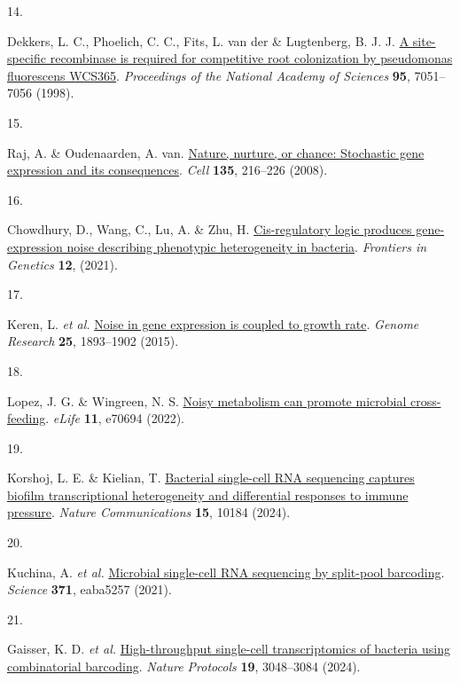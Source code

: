 \documentclass[
  11pt,
  a4paper,
]{report}
\newlength{\cslhangindent}
\newlength{\csllabelwidth}
\newenvironment{CSLReferences}[2] %
 {\begin{list}{}{%
  \setlength{\itemindent}{0pt}
  \setlength{\leftmargin}{0pt}
  \setlength{\parsep}{0pt}
  \ifodd #1
   \setlength{\leftmargin}{\cslhangindent}
   \setlength{\itemindent}{-1\cslhangindent}
  \fi
  \setlength{\itemsep}{#2\baselineskip}}}
 {\end{list}}
\newcommand{\CSLLeftMargin}[1]{\parbox[t]{\csllabelwidth}{\strut#1\strut}}
\newcommand{\CSLRightInline}[1]{\parbox[t]{\linewidth - \csllabelwidth}{\strut#1\strut}}
\begin{document}
\begin{CSLReferences}{0}{0}
\CSLLeftMargin{14. }%
\CSLRightInline{Dekkers, L. C., Phoelich, C. C., Fits, L. van der \&
Lugtenberg, B. J. J. \href{https://doi.org/10.1073/pnas.95.12.7051}{A
site-specific recombinase is required for competitive root colonization
by pseudomonas fluorescens WCS365}. \emph{Proceedings of the National
Academy of Sciences} \textbf{95}, 7051--7056 (1998).}

\CSLLeftMargin{15. }%
\CSLRightInline{Raj, A. \& Oudenaarden, A. van.
\href{https://doi.org/10.1016/j.cell.2008.09.050}{Nature, nurture, or
chance: Stochastic gene expression and its consequences}. \emph{Cell}
\textbf{135}, 216--226 (2008).}

\CSLLeftMargin{16. }%
\CSLRightInline{Chowdhury, D., Wang, C., Lu, A. \& Zhu, H.
\href{https://doi.org/10.3389/fgene.2021.698910}{Cis-regulatory logic
produces gene-expression noise describing phenotypic heterogeneity in
bacteria}. \emph{Frontiers in Genetics} \textbf{12}, (2021).}

\CSLLeftMargin{17. }%
\CSLRightInline{Keren, L. \emph{et al.}
\href{https://doi.org/10.1101/gr.191635.115}{Noise in gene expression is
coupled to growth rate}. \emph{Genome Research} \textbf{25}, 1893--1902
(2015).}

\CSLLeftMargin{18. }%
\CSLRightInline{Lopez, J. G. \& Wingreen, N. S.
\href{https://doi.org/10.7554/eLife.70694}{Noisy metabolism can promote
microbial cross-feeding}. \emph{eLife} \textbf{11}, e70694 (2022).}

\CSLLeftMargin{19. }%
\CSLRightInline{Korshoj, L. E. \& Kielian, T.
\href{https://doi.org/10.1038/s41467-024-54581-8}{Bacterial single-cell
RNA sequencing captures biofilm transcriptional heterogeneity and
differential responses to immune pressure}. \emph{Nature Communications}
\textbf{15}, 10184 (2024).}

\CSLLeftMargin{20. }%
\CSLRightInline{Kuchina, A. \emph{et al.}
\href{https://doi.org/10.1126/science.aba5257}{Microbial single-cell RNA
sequencing by split-pool barcoding}. \emph{Science} \textbf{371},
eaba5257 (2021).}

\CSLLeftMargin{21. }%
\CSLRightInline{Gaisser, K. D. \emph{et al.}
\href{https://doi.org/10.1038/s41596-024-01007-w}{High-throughput
single-cell transcriptomics of bacteria using combinatorial barcoding}.
\emph{Nature Protocols} \textbf{19}, 3048--3084 (2024).}


\end{CSLReferences}
\end{document}
